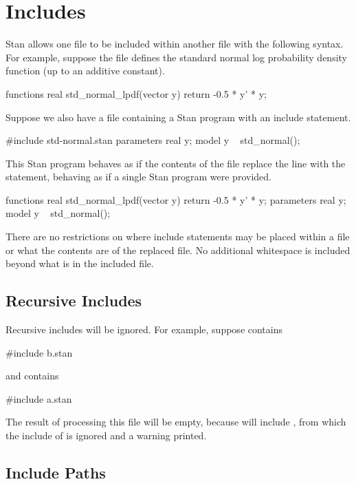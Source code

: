 \section{Includes}\label{includes.section}

Stan allows one file to be included within another file with the
following syntax.  For example, suppose the file
 defines the standard normal log probability
density function (up to an additive constant).
%
\begin{stancode}
functions {
  real std_normal_lpdf(vector y) {
    return -0.5 * y' * y;
  }
}
\end{stancode}
%
Suppose we also have a file containing a Stan program with an include
statement.
%
\begin{stancode}
#include std-normal.stan
parameters {
  real y;
}
model {
  y ~ std_normal();
}
\end{stancode}
%
This Stan program behaves as if the contents of the file
 replace the line with the 
statement, behaving as if a single Stan program were provided.
%
\begin{stancode}
functions {
  real std_normal_lpdf(vector y) {
    return -0.5 * y' * y;
  }
}
parameters {
  real y;
}
model {
  y ~ std_normal();
}
\end{stancode}
%

There are no restrictions on where include statements may be placed
within a file or what the contents are of the replaced file.  No
additional whitespace is included beyond what is in the included file.

\subsection{Recursive Includes}

Recursive includes will be ignored.  For example, suppose
 contains
%
\begin{stancode}
#include b.stan
\end{stancode}
%
and  contains
%
\begin{stancode}
#include a.stan
\end{stancode}
%
The result of processing this file will be empty, because
 will include , from which the include of
 is ignored and a warning printed.

\subsection{Include Paths}


